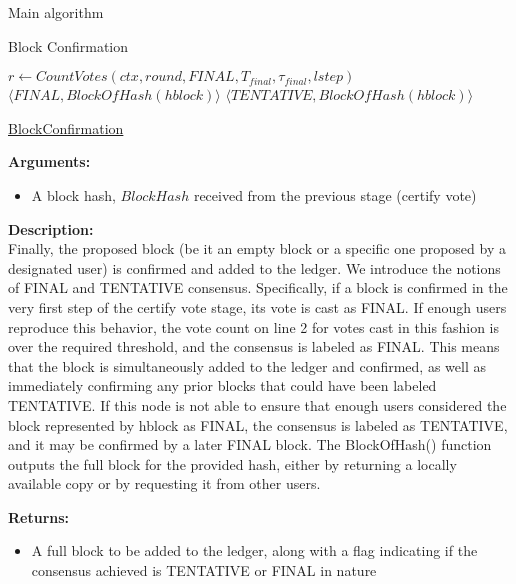\documentclass[10pt,a4paper]{article}
\begin{document}
\begin{section}{Main algorithm}
\begin{subsection}{Block Confirmation}
\begin{algorithm}[H]
    \begin{algorithmic}[H]

    \State $r \gets CountVotes(ctx, round, FINAL, T_{final}, \tau_{final}, lstep)$
        \State \Return $\langle FINAL, BlockOfHash(hblock)\rangle$ 
    \Else
    {
        \State \Return $\langle TENTATIVE, BlockOfHash(hblock)\rangle $
    }
    \EndIf
    \EndFunction
    \end{algorithmic}
    \caption{\underline{BlockConfirmation}}
\end{algorithm}


\noindent \textbf{Arguments:}
\begin{itemize}
    \item A block hash, $BlockHash$ received from the previous stage (certify vote)
  \end{itemize}

\noindent \textbf{Description:}\\
Finally, the proposed block (be it an empty block or a specific one 
proposed by a designated user) is confirmed and added to the ledger.
We introduce the notions of FINAL and TENTATIVE consensus.
Specifically, if a block is confirmed in the very first step of the
certify vote stage, its vote is cast as FINAL.
If enough users reproduce this behavior, the vote count on line 2 for 
votes cast in this fashion is over the required threshold, and the 
consensus is labeled as FINAL.
This means that the block is simultaneously added to the ledger and 
confirmed, as well as immediately confirming any prior blocks that 
could have been labeled TENTATIVE.
If this node is not able to ensure that enough users considered the 
block represented by hblock as FINAL, the consensus is labeled as 
TENTATIVE, and it may be confirmed by a later FINAL block.
The BlockOfHash() function outputs the full block for the provided 
hash, either by returning a locally available copy or by requesting 
it from other users.

\noindent \textbf{Returns:}
\begin{itemize}
    \item A full block to be added to the ledger, along with a flag indicating if
    the consensus achieved is TENTATIVE or FINAL in nature
  \end{itemize}

\end{subsection}
\end{section}
\end{document}
